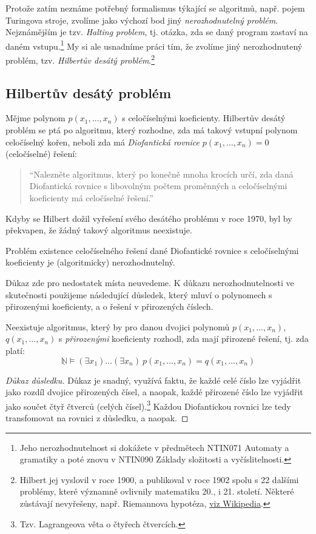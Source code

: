 Protože zatím neznáme potřebný formalismus týkající se algoritmů, např. pojem Turingova stroje, zvolíme jako výchozí bod jiný \emph{nerozhodnutelný problém}. Nejznámějším je tzv. \emph{Halting problem}, tj. otázka, zda se daný program zastaví na daném vstupu.\footnote{Jeho nerozhodnutelnost si dokážete v předmětech NTIN071 Automaty a gramatiky a poté znovu v NTIN090 Základy složitosti a vyčíslitelnosti.} My si ale usnadníme práci tím, že zvolíme jiný nerozhodnutený problém, tzv. \emph{Hilbertův desátý problém}.\footnote{Hilbert jej vyslovil v roce 1900, a publikoval v roce 1902 spolu s 22 dalšími problémy, které významně ovlivnily matematiku 20., i 21. století. Některé zůstávají nevyřešeny, např. Riemannova hypotéza, \href{https://en.wikipedia.org/wiki/Logic_in_computer_science}{viz Wikipedia}.}

\subsection{Hilbertův desátý problém}

Mějme polynom $p(x_1,\dots,x_n)$ s celočíselnými koeficienty. Hilbertův desátý problém se ptá po algoritmu, který rozhodne, zda má takový vstupní polynom celočíselný kořen, neboli zda má \emph{Diofantická rovnice}  $p(x_1,\dots,x_n)=0$ (celočíselné) řešení:
\begin{quote}
    ``Nalezněte algoritmus, který po konečně mnoha krocích určí, zda daná Diofantická rovnice s libovolným počtem proměnných a
    celočíselnými koeficienty má celočíselné řešení.''
\end{quote}

Kdyby se Hilbert dožil vyřešení svého desátého problému v roce 1970, byl by překvapen, že žádný takový algoritmus neexistuje.

\begin{theorem}
Problém existence celočíselného řešení dané Diofantické rovnice s celočíselnými koeficienty je (algoritmicky) nerozhodnutelný.
\end{theorem}

Důkaz zde pro nedostatek místa neuvedeme. K důkazu nerozhodnutelnosti ve skutečnosti použijeme následující důsledek, který mluví o polynomech s přirozenými koeficienty, a o řešení v přirozených číslech. 

\begin{corollary}
Neexistuje algoritmus, který by pro danou dvojici polynomů $p(x_1,\dots,x_n)$, $q(x_1,\dots,x_n)$ s \emph{přirozenými} koeficienty rozhodl, zda mají přirozené řešení, tj. zda platí:
$$
\underline{\mathbb N}\models(\exists x_1)\dots(\exists x_n)\ p(x_1,\dots,x_n)=q(x_1,\dots,x_n)
$$
\end{corollary}
\begin{proof}[Důkaz důsledku]
Důkaz je snadný, využívá faktu, že každé celé číslo lze vyjádřit jako rozdíl dvojice přirozených čísel, a naopak, každé přirozené číslo lze vyjádřit jako součet čtyř čtverců (celých čísel).\footnote{Tzv. Lagrangeova věta o čtyřech čtvercích.} Každou Diofantickou rovnici lze tedy transfomovat na rovnici z důsledku, a naopak.
\end{proof}




